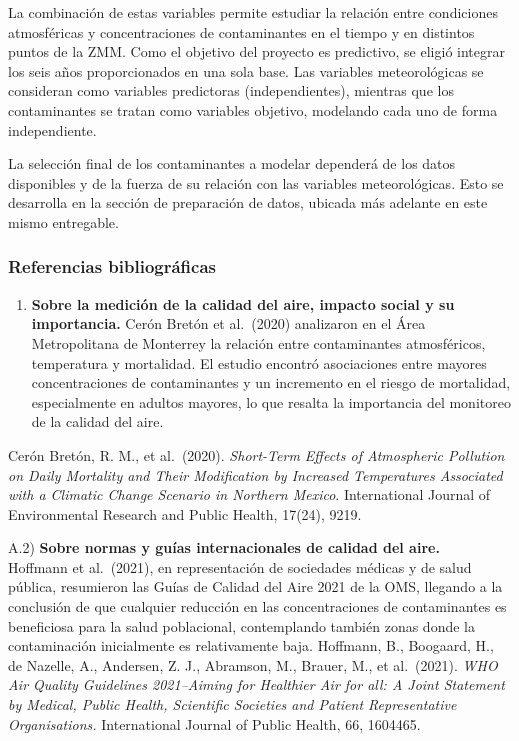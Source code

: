 \documentclass[
  letterpaper,
  DIV=11,
  numbers=noendperiod]{scrartcl}
\providecommand{\tightlist}{%
  \setlength{\itemsep}{0pt}\setlength{\parskip}{0pt}}
\begin{document}
La combinación de estas variables permite estudiar la relación entre
condiciones atmosféricas y concentraciones de contaminantes en el tiempo
y en distintos puntos de la ZMM. Como el objetivo del proyecto es
predictivo, se eligió integrar los seis años proporcionados en una sola
base. Las variables meteorológicas se consideran como variables
predictoras (independientes), mientras que los contaminantes se tratan
como variables objetivo, modelando cada uno de forma independiente.

La selección final de los contaminantes a modelar dependerá de los datos
disponibles y de la fuerza de su relación con las variables
meteorológicas. Esto se desarrolla en la sección de preparación de
datos, ubicada más adelante en este mismo entregable.

\subsubsection{Referencias
bibliográficas}\label{referencias-bibliogruxe1ficas}

\begin{enumerate}
\def\labelenumi{\Alph{enumi})}
\tightlist
\item
  \textbf{Sobre la medición de la calidad del aire, impacto social y su
  importancia.} Cerón Bretón et al.~(2020) analizaron en el Área
  Metropolitana de Monterrey la relación entre contaminantes
  atmosféricos, temperatura y mortalidad. El estudio encontró
  asociaciones entre mayores concentraciones de contaminantes y un
  incremento en el riesgo de mortalidad, especialmente en adultos
  mayores, lo que resalta la importancia del monitoreo de la calidad del
  aire.
\end{enumerate}

Cerón Bretón, R. M., et al.~(2020). \emph{Short-Term Effects of
Atmospheric Pollution on Daily Mortality and Their Modification by
Increased Temperatures Associated with a Climatic Change Scenario in
Northern Mexico}. International Journal of Environmental Research and
Public Health, 17(24), 9219.

A.2) \textbf{Sobre normas y guías internacionales de calidad del
aire.}\\
Hoffmann et al.~(2021), en representación de sociedades médicas y de
salud pública, resumieron las Guías de Calidad del Aire 2021 de la OMS,
llegando a la conclusión de que cualquier reducción en las
concentraciones de contaminantes es beneficiosa para la salud
poblacional, contemplando también zonas donde la contaminación
inicialmente es relativamente baja. Hoffmann, B., Boogaard, H., de
Nazelle, A., Andersen, Z. J., Abramson, M., Brauer, M., et al.~(2021).
\emph{WHO Air Quality Guidelines 2021--Aiming for Healthier Air for all:
A Joint Statement by Medical, Public Health, Scientific Societies and
Patient Representative Organisations.} International Journal of Public
Health, 66, 1604465.
\end{document}

